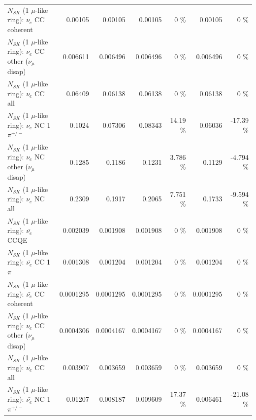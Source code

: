 \begin{table}
\begin{tabular}{| l | r | r | r  r | r  r |}
                               $N_{SK}$ (1 $\mu$-like ring): $\nu_e$ CC coherent &         0.00105 &         0.00105 &         0.00105 &        0 \%  &         0.00105 &        0 \%  \\ 
                $N_{SK}$ (1 $\mu$-like ring): $\nu_e$ CC other ($\nu_\mu$ disap) &        0.006611 &        0.006496 &        0.006496 &        0 \%  &        0.006496 &        0 \%  \\ 
                                  $N_{SK}$ (1 $\mu$-like ring): $\nu_{e}$ CC all &         0.06409 &         0.06138 &         0.06138 &        0 \%  &         0.06138 &        0 \%  \\ 
\hline
                           $N_{SK}$ (1 $\mu$-like ring): $\nu_e$ NC 1$\pi^{+/-}$ &          0.1024 &         0.07306 &         0.08343 &    14.19 \%  &         0.06036 &   -17.39 \%  \\ 
                $N_{SK}$ (1 $\mu$-like ring): $\nu_e$ NC other ($\nu_\mu$ disap) &          0.1285 &          0.1186 &          0.1231 &    3.786 \%  &          0.1129 &   -4.794 \%  \\ 
                                  $N_{SK}$ (1 $\mu$-like ring): $\nu_{e}$ NC all &          0.2309 &          0.1917 &          0.2065 &    7.751 \%  &          0.1733 &   -9.594 \%  \\ 
\hline
\hline
\hline
                                $N_{SK}$ (1 $\mu$-like ring): $\bar{\nu_e}$ CCQE &        0.002039 &        0.001908 &        0.001908 &        0 \%  &        0.001908 &        0 \%  \\ 
                           $N_{SK}$ (1 $\mu$-like ring): $\bar{\nu_e}$ CC 1$\pi$ &        0.001308 &        0.001204 &        0.001204 &        0 \%  &        0.001204 &        0 \%  \\ 
                         $N_{SK}$ (1 $\mu$-like ring): $\bar{\nu_e}$ CC coherent &       0.0001295 &       0.0001295 &       0.0001295 &        0 \%  &       0.0001295 &        0 \%  \\ 
          $N_{SK}$ (1 $\mu$-like ring): $\bar{\nu_e}$ CC other ($\nu_\mu$ disap) &       0.0004306 &       0.0004167 &       0.0004167 &        0 \%  &       0.0004167 &        0 \%  \\ 
                            $N_{SK}$ (1 $\mu$-like ring): $\bar{\nu_{e}}$ CC all &        0.003907 &        0.003659 &        0.003659 &        0 \%  &        0.003659 &        0 \%  \\ 
\hline
                     $N_{SK}$ (1 $\mu$-like ring): $\bar{\nu_e}$ NC 1$\pi^{+/-}$ &         0.01207 &        0.008187 &        0.009609 &    17.37 \%  &        0.006461 &   -21.08 \%  \\ 

\end{tabular}
\end{table}

